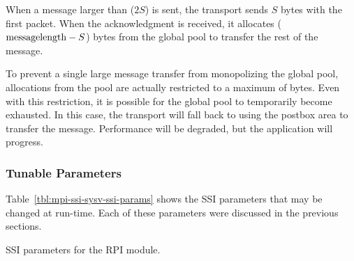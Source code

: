 When a message larger than ($2S$) is sent, the transport sends $S$
bytes with the first packet.  When the acknowledgment is received, it
allocates (${\rm message length} - S$) bytes from the global pool to
transfer the rest of the message.

To prevent a single large message transfer from monopolizing the
global pool, allocations from the pool are actually restricted to a
maximum of  bytes.  Even
with this restriction, it is possible for the global pool to
temporarily become exhausted.  In this case, the transport will fall
back to using the postbox area to transfer the message.  Performance
will be degraded, but the application will progress.


\subsubsection{Tunable Parameters}

Table~\ref{tbl:mpi-ssi-sysv-ssi-params} shows the SSI parameters that
may be changed at run-time.  Each of these parameters were discussed
in the previous sections.

\begin{table}[htbp]
  \begin{ssiparamtb}
%
%
%
%
%
%
%
  \end{ssiparamtb}
  \caption{SSI parameters for the  RPI module.}
  \label{tbl:mpi-ssi-sysv-ssi-params}
\end{table}


